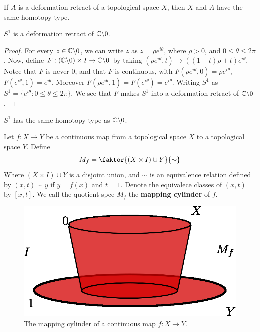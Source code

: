 \begin{theorem}\label{2.4.12}
    If $A$ is a deformation retract of a topological space  $X$, then  $X$ and
    $A$ have the same homotopy type.
\end{theorem}
\begin{corollary}
    $S^1$ is a deformation retract of  $\mathbb{C} \backslash 0$.
\end{corollary}
\begin{proof}
    For every $z \in \mathbb{C} \backslash 0$, we can write $z$ as  $z=\rho e^{i\theta}$,
    where $\rho>0$, and  $0 \leq \theta \leq 2\pi$. Now, define
    $F:(\mathbb{C} \backslash 0) \times I \xrightarrow{} \mathbb{C} \backslash 0$ by taking $(\rho
    e^{i\theta},t) \xrightarrow{} ((1-t)\rho+t)e^{i\theta}$. Notce that $F$ is
    never  $0$, and that $F$ is continuous, with $F(\rho e^{i\theta},0)=\rho
    e^{i\theta}$, $F(e^{i\theta},1)=e^{i\theta}$. Moreover $F(\rho
    e^{i\theta},1)=F(e^{i\theta})=e^{i\theta}$. Writing $S^1$ as
    $S^1=\{e^{i\theta} : 0 \leq \theta \leq 2\pi\}$. We see that $F$ makes $S^1$
    into a deformation retract of $\mathbb{C} \backslash 0$.
\end{proof}
\begin{corollary}
    $S^1$ has the same homotopy type as  $\mathbb{C} \backslash 0$.
\end{corollary}

\begin{definition}
    Let $f:X \xrightarrow{} Y$ be a continuous map from a topological space $X$
    to a topological space  $Y$. Define
    \begin{equation*}
        M_f=\faktor{(X \times I) \cup Y}{\sim}
    \end{equation*}
    Where $(X \times I) \cup Y$ is a disjoint union, and $\sim$ is an
    equivalence relation defined by $(x,t) \sim y$ if $y=f(x)$ and  $t=1$.
    Denote the equivalece classes of $(x,t)$ by $[x,t]$. We call the quotient
    spce $M_f$ the  \textbf{mapping cylinder} of $f$.
\end{definition}

\begin{figure}[h]
    \centering
    \includegraphics[scale=0.5]{Figures/Chapter2/mapping_cylinder.eps}
    \caption{The mapping cylinder of a continuous map $f:X \xrightarrow{} Y$.}
    \label{fig_2.2}
\end{figure}
